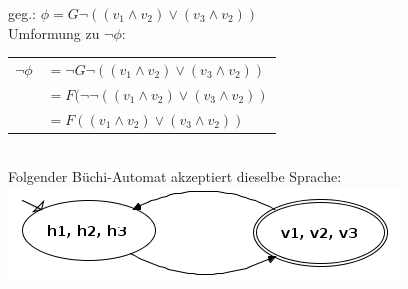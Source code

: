\documentclass[a4paper,12pt]{scrartcl}
\begin{document}
\subsubsection{}
geg.: $\phi = G\lnot((v_1 \land v_2) \lor (v_3 \land v_2))$\\
Umformung zu $\lnot\phi$:\\
\begin{tabular}{ll}
$\lnot\phi$&$=\lnot G\lnot((v_1 \land v_2) \lor (v_3 \land v_2))$\\
&$=F(\lnot\lnot((v_1 \land v_2) \lor (v_3 \land v_2))$\\
&$=F((v_1 \land v_2) \lor (v_3 \land v_2))$
\end{tabular}\\
Folgender Büchi-Automat akzeptiert dieselbe Sprache:\\
\includegraphics[scale=0.5]{roboter_buechi.png}
\subsubsection{}

\subsection{}
\end{document}
